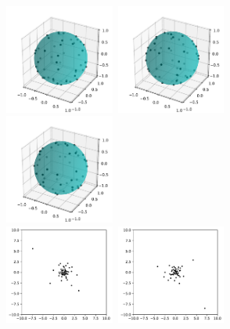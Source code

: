 \documentclass[twoside,11pt]{book}
\numberwithin{theorem}{chapter}
\numberwithin{definition}{chapter}
\numberwithin{proposition}{chapter}
\numberwithin{corollary}{chapter}
\numberwithin{example}{chapter}
\numberwithin{lemma}{chapter}
\numberwithin{assumption}{chapter}
\begin{document}
\begin{figure}
\centering
\includegraphics[width= 0.32\textwidth]{img/Spherical/Spherical_50_example_id_1.pdf}~\includegraphics[width= 0.32\textwidth]{img/Spherical/Spherical_50_example_id_2.pdf}
~\includegraphics[width= 0.32\textwidth]{img/Spherical/Spherical_50_example_id_3.pdf}\\
\includegraphics[width= 0.32\textwidth]{img/Spherical/Spherical_beforestero_50_example_id_1.pdf}~\includegraphics[width= 0.32\textwidth]{img/Spherical/Spherical_beforestero_50_example_id_2.pdf}

\end{figure}
\end{document}
